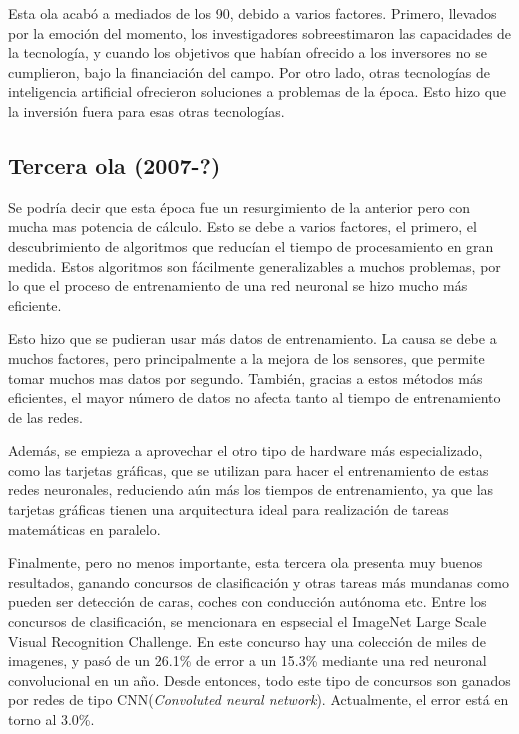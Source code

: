 \documentclass[12pt]{book}
\numberwithin{equation}{section}
\begin{document}
Esta ola acabó a mediados de los 90, debido a varios factores. Primero, llevados por la emoción del momento, los investigadores sobreestimaron las capacidades de la tecnología, y cuando los objetivos que habían ofrecido a los inversores no se cumplieron, bajo la financiación del campo. Por otro lado, otras tecnologías de inteligencia artificial ofrecieron soluciones a problemas de la época. Esto hizo que la inversión fuera para esas otras tecnologías.

\subsection{Tercera ola (2007-?)}
Se podría decir que esta época fue un resurgimiento de la anterior pero con mucha mas potencia de cálculo.  Esto se debe a varios factores, el primero, el descubrimiento de algoritmos que reducían el tiempo de procesamiento en gran medida\cite{doi:10.1162/neco.2006.18.7.1527}. Estos algoritmos son fácilmente generalizables a muchos problemas, por lo que el proceso de entrenamiento de una red neuronal se hizo mucho más eficiente.


Esto hizo que se pudieran usar más datos de entrenamiento. La causa se debe a muchos factores, pero principalmente a la mejora de los sensores, que permite tomar muchos mas datos por segundo. También, gracias a estos métodos más eficientes, el mayor número de datos no afecta tanto al tiempo de entrenamiento de las redes.

Además, se empieza a aprovechar el otro tipo de hardware más especializado, como las tarjetas gráficas, que se utilizan para hacer el entrenamiento de estas redes neuronales, reduciendo aún más los tiempos de entrenamiento, ya que las tarjetas gráficas tienen una arquitectura ideal para realización de tareas matemáticas en paralelo.

Finalmente, pero no menos importante, esta tercera ola presenta muy buenos resultados, ganando concursos de clasificación y otras tareas más mundanas como pueden ser detección de caras, coches con conducción autónoma etc. Entre los concursos de clasificación, se mencionara en espsecial el ImageNet Large Scale Visual Recognition Challenge. En este concurso hay una colección de miles de imagenes, y pasó de un 26.1\% de error a un 15.3\%\cite{concursos} mediante una red neuronal convolucional en un año. Desde entonces, todo este tipo de concursos son ganados por redes de tipo CNN(\textit{Convoluted neural network}). Actualmente, el error está en torno al 3.0\%.
\end{document}
